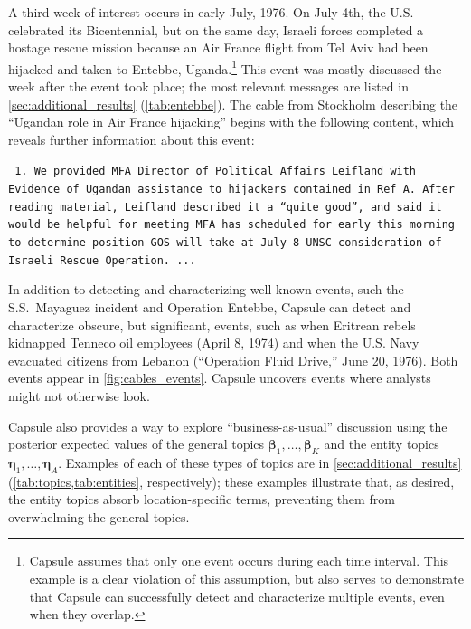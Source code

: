 A third week of interest occurs in early July, 1976.  On July 4th, the
U.S. celebrated its Bicentennial, but on the same day, Israeli forces
completed a hostage rescue mission because an Air France flight from
Tel Aviv had been hijacked and taken to Entebbe,
Uganda.\footnote{Capsule assumes that only one event occurs during
  each time interval. This example is a clear violation of this
  assumption, but also serves to demonstrate that Capsule can
  successfully detect and characterize multiple events, even when they
  overlap.} This event was mostly discussed the week after the event
took place; the most relevant messages are listed in
\cref{sec:additional_results} (\cref{tab:entebbe}). The cable from
Stockholm describing the ``Ugandan role in Air France hijacking''
begins with the following content, which reveals further information
about this event:
\begin{shaded*} \tt{
1. We provided MFA Director of Political Affairs
Leifland with Evidence of Ugandan assistance to
hijackers contained in Ref A.  After reading material,{}
Leifland described it a ``quite good'', and said it{}
would be helpful for meeting MFA has scheduled for
early this morning to determine position GOS will take
at July 8 UNSC consideration of Israeli Rescue Operation. ...
}
\end{shaded*}

In addition to detecting and characterizing well-known events, such
the S.S.~Mayaguez incident and Operation Entebbe, Capsule can detect
and characterize obscure, but significant, events, such as when Eritrean rebels
kidnapped Tenneco oil employees (April 8, 1974) and when the U.S. Navy evacuated citizens
from Lebanon (``Operation Fluid Drive,'' June 20, 1976). Both
events appear in \cref{fig:cables_events}.
Capsule uncovers events where analysts might not otherwise look.

Capsule also provides a way to explore ``business-as-usual''
discussion using the posterior expected values of the general topics
$\mathbold{\beta}_1, \ldots, \mathbold{\beta}_K$ and the entity topics
$\mathbold{\eta}_1, \ldots, \mathbold{\eta}_A$. Examples of each of
these types of topics are in \cref{sec:additional_results}
(\cref{tab:topics,tab:entities}, respectively); these examples
illustrate that, as desired, the entity topics absorb
location-specific terms, preventing them from overwhelming the general
topics.

